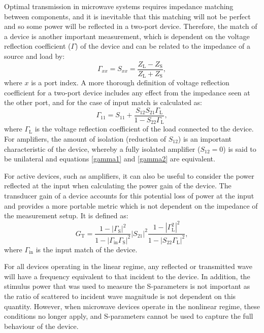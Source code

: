 \documentclass[../thesis/thesis.tex]{subfiles}
\begin{document}
\begin{refsection}
Optimal transmission in microwave systems requires impedance matching between components, and it is inevitable that this matching will not be perfect and so some power will be reflected in a two-port device. Therefore, the match of a device is another important measurement, which is dependent on the voltage reflection coefficient ($\Gamma$) of the device and can be related to the impedance of a source and load by:
\begin{equation}
\Gamma_{xx} = S_{xx} = \dfrac{Z_\textrm{L}-Z_\textrm{S}}{Z_\textrm{L}+Z_\textrm{S}},
\label{gamma1}
\end{equation}
where $x$ is a port index.
A more thorough definition of voltage reflection coefficient for a two-port device includes any effect from the impedance seen at the other port, and for the case of input match is calculated as:
\begin{equation}
\Gamma_{11} = S_{11} + \dfrac{S_{12}S_{21}\Gamma_\textrm{L}}
{1-S_{22}\Gamma_\textrm{L}},
\label{gamma2}
\end{equation}
where $\Gamma_\textrm{L}$ is the voltage reflection coefficient of the load connected to the device. For amplifiers, the amount of isolation (reduction of $S_{12}$) is an important characteristic of the device, whereby a fully isolated amplifier ($S_{12}=0$) is said to be unilateral and equations \ref{gamma1} and \ref{gamma2} are equivalent.

For active devices, such as amplifiers, it can also be useful to consider the power reflected at the input when calculating the power gain of the device. The transducer gain of a device accounts for this potential loss of power at the input and provides a more portable metric which is not dependent on the impedance of the measurement setup. It is defined as:
\begin{equation}
G_\textrm{T} = \dfrac{1-|\Gamma_\textrm{S}|^2}
{1-|\Gamma_\textrm{in}\Gamma_\textrm{S}|^2}
|S_{21}|^2
\dfrac{1-|\Gamma_\textrm{L}^2|^2}
{1-|S_{22}\Gamma_\textrm{L}|^2},
\end{equation}
where $\Gamma_\textrm{in}$ is the input match of the device.

For all devices operating in the linear regime, any reflected or transmitted wave will have a frequency equivalent to that incident to the device. In addition, the stimulus power that was used to measure the S-parameters is not important as the ratio of scattered to incident wave magnitude is not dependent on this quantity. However, when microwave devices operate in the nonlinear regime, these conditions no longer apply, and S-parameters cannot be used to capture the full behaviour of the device.


\end{refsection}
\end{document}
